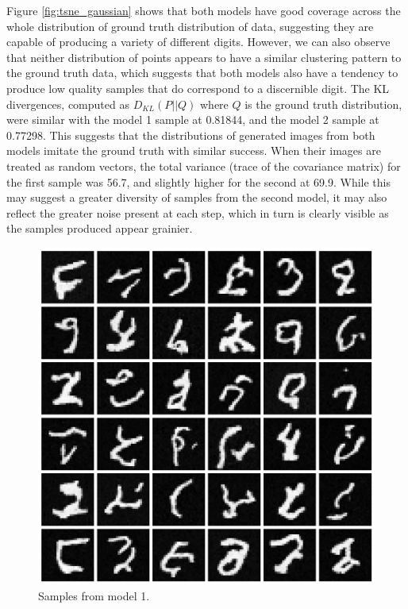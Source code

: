\documentclass[12pt]{article}
\begin{document}
Figure \ref{fig:tsne_gaussian} shows that both models have good coverage across the whole distribution of ground truth distribution of data,
suggesting they are capable of producing a variety of different digits.
However, we can also observe that neither distribution of points appears to have a similar clustering pattern to the ground truth data,
which suggests that both models also have a tendency to produce low quality samples that do correspond to a discernible digit.
The KL divergences, computed as $D_{KL}(P||Q)$ where $Q$ is the ground truth distribution, were similar with the model 1 sample at 0.81844,
and the model 2 sample at 0.77298.
This suggests that the distributions of generated images from both models imitate the ground truth with similar success.
When their images are treated as random vectors, the total variance (trace of the covariance matrix) for the first sample was 56.7,
and slightly higher for the second at 69.9.
While this may suggest a greater diversity of samples from the second model, it may also reflect the greater noise present at each step,
which in turn is clearly visible as the samples produced appear grainier.

\begin{figure}[hp]
    \includegraphics[scale=0.3, center]{figures/samples_1.png}
    \caption{Samples from model 1.}
    \label{fig:samples_1}
\end{figure}
\end{document}
